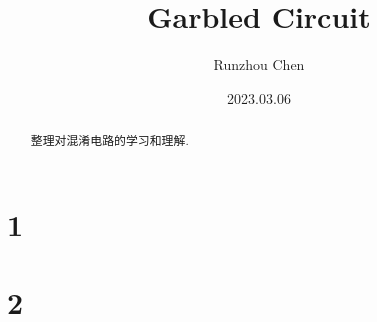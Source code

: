 \documentclass{ctexart}
\begin{document}
\title{Garbled Circuit}
\author{Runzhou Chen}
\date{2023.03.06}
\maketitle


\begin{abstract}
    整理对混淆电路的学习和理解.
\end{abstract}


\tableofcontents


\section{1}


\section{2}


\end{document}
